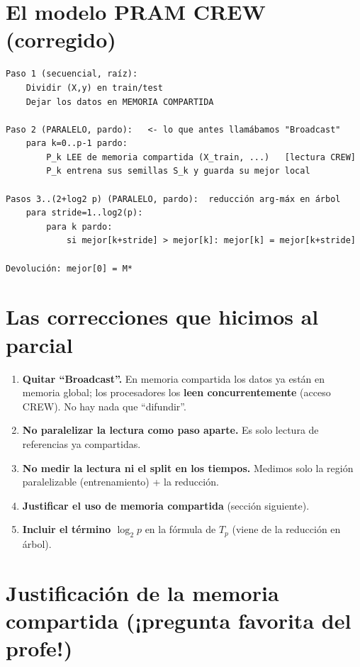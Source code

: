 \documentclass[11pt,a4paper]{article}
\begin{document}
\section{El modelo PRAM CREW (corregido)}

\begin{caja}[title=\textbf{Algoritmo 2 --- PRAM CREW (memoria compartida)}]
\begin{verbatim}
Paso 1 (secuencial, raíz):
    Dividir (X,y) en train/test
    Dejar los datos en MEMORIA COMPARTIDA

Paso 2 (PARALELO, pardo):   <- lo que antes llamábamos "Broadcast"
    para k=0..p-1 pardo:
        P_k LEE de memoria compartida (X_train, ...)   [lectura CREW]
        P_k entrena sus semillas S_k y guarda su mejor local

Pasos 3..(2+log2 p) (PARALELO, pardo):  reducción arg-máx en árbol
    para stride=1..log2(p):
        para k pardo:
            si mejor[k+stride] > mejor[k]: mejor[k] = mejor[k+stride]

Devolución: mejor[0] = M*
\end{verbatim}
\end{caja}

\section{Las correcciones que hicimos al parcial}

\begin{enumerate}
  \item \textbf{Quitar ``Broadcast''.} En memoria compartida los datos ya están
        en memoria global; los procesadores los \textbf{leen concurrentemente}
        (acceso CREW). No hay nada que ``difundir''.
  \item \textbf{No paralelizar la lectura como paso aparte.} Es solo lectura de
        referencias ya compartidas.
  \item \textbf{No medir la lectura ni el split en los tiempos.} Medimos solo la
        región paralelizable (entrenamiento) + la reducción.
  \item \textbf{Justificar el uso de memoria compartida} (sección siguiente).
  \item \textbf{Incluir el término $\log_2 p$} en la fórmula de $T_p$ (viene de
        la reducción en árbol).
\end{enumerate}

\section{Justificación de la memoria compartida (¡pregunta favorita del profe!)}
\end{document}
